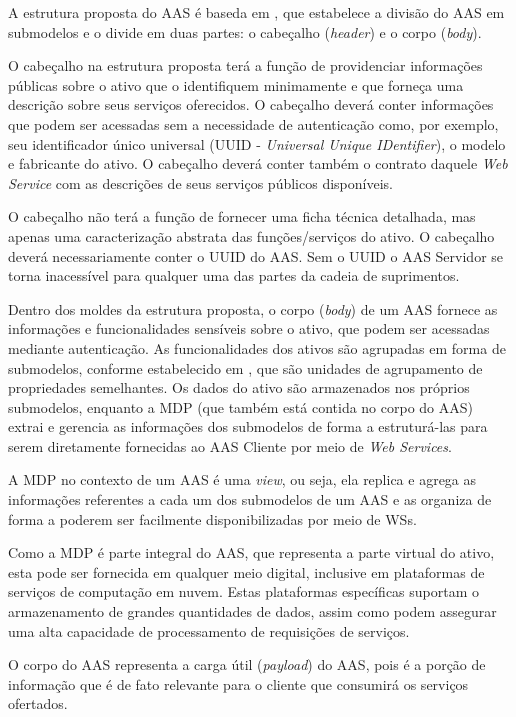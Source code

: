 	A estrutura proposta do AAS é baseda em , que estabelece a divisão do AAS em submodelos e o divide em duas partes: o cabeçalho (\textit{header}) e o corpo (\textit{body}).
	
	O cabeçalho na estrutura proposta terá a função de providenciar informações públicas sobre o ativo que o identifiquem minimamente e que forneça uma descrição sobre seus serviços oferecidos. O cabeçalho deverá conter informações que podem ser acessadas sem a necessidade de autenticação como, por exemplo, seu identificador único universal (UUID - \textit{Universal Unique IDentifier}), o modelo e fabricante do ativo. O cabeçalho deverá conter também o contrato daquele \textit{Web Service} com as descrições de seus serviços públicos disponíveis.
	
	O cabeçalho não terá a função de fornecer uma ficha técnica detalhada, mas apenas uma caracterização abstrata das funções/serviços do ativo. O cabeçalho deverá necessariamente conter o UUID do AAS. Sem o UUID o AAS Servidor se torna inacessível para qualquer uma das partes da cadeia de suprimentos.
	
	Dentro dos moldes da estrutura proposta, o corpo (\textit{body}) de um AAS fornece as informações e funcionalidades sensíveis sobre o ativo, que podem ser acessadas mediante autenticação. As funcionalidades dos ativos são agrupadas em forma de submodelos, conforme estabelecido em , que são unidades de agrupamento de propriedades semelhantes. Os dados do ativo são armazenados nos próprios submodelos, enquanto a MDP (que também está contida no corpo do AAS) extrai e gerencia as informações dos submodelos de forma a estruturá-las para serem diretamente fornecidas ao AAS Cliente por meio de \textit{Web Services}.
	
	A MDP no contexto de um AAS é uma \textit{view}, ou seja, ela replica e agrega as informações referentes a cada um dos submodelos de um AAS e as organiza de forma a poderem ser facilmente disponibilizadas por meio de WSs.
	
	Como a MDP é parte integral do AAS, que representa a parte virtual do ativo, esta pode ser fornecida em qualquer meio digital, inclusive em plataformas de serviços de computação em nuvem. Estas plataformas específicas suportam o armazenamento de grandes quantidades de dados, assim como podem assegurar uma alta capacidade de processamento de requisições de serviços.
	
	O corpo do AAS representa a carga útil (\textit{payload}) do AAS, pois é a porção de informação que é de fato relevante para o cliente que consumirá os serviços ofertados.
	
